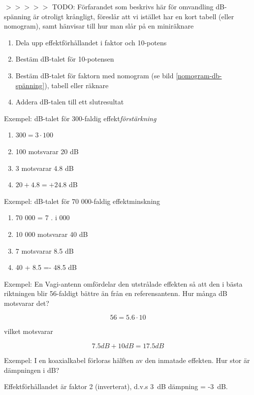 \begin{rev-raderas}

$>>>>>$ TODO: Förfarandet som beskrivs här för omvandling dB-spänning är otroligt krångligt, föreslår att vi istället har en kort tabell (eller nomogram), samt hänvisar till hur man slår på en miniräknare


\begin{enumerate}
\item Dela upp effektförhållandet i faktor och 10-potens
\item Bestäm dB-talet för 10-potensen
\item Bestäm dB-talet för faktorn med nomogram (se bild
  \ref{nomogram-db-spänning}), tabell eller räknare
\item Addera dB-talen till ett slutresultat
\end{enumerate}

Exempel: dB-talet för 300-faldig effekt\emph{förstärkning}
\begin{enumerate}
\item \(300 = 3 \cdot 100\)
\item 100 motsvarar 20 dB
\item 3 motsvarar 4.8 dB
\item \(20 + 4.8 = +24.8\) dB
\end{enumerate}

Exempel: dB-talet för 70 000-faldig effektminskning
\begin{enumerate}
\item 70 000 = 7 . i 000
\item 10 000 motsvarar 40 dB
\item 7 motsvarar 8.5 dB
\item 40 + 8.5 =- 48.5 dB
\end{enumerate}

Exempel: En Vagi-antenn omfördelar den utstrålade effekten så att den
i bästa riktningen blir 56-faldigt bättre än från en
referensantenn. Hur många dB motsvarar det?

\[ 56 = 5.6 \cdot 10\]

vilket motsvarar

\[ 7.5 dB + 10 dB = 17.5 dB\]

Exempel: I en koaxialkabel förloras hälften av den inmatade
effekten. Hur stor är dämpningen i dB?

Effektförhållandet är faktor 2 (inverterat), d.v.s 3~dB dämpning =
-3~dB.

\end{rev-raderas}

